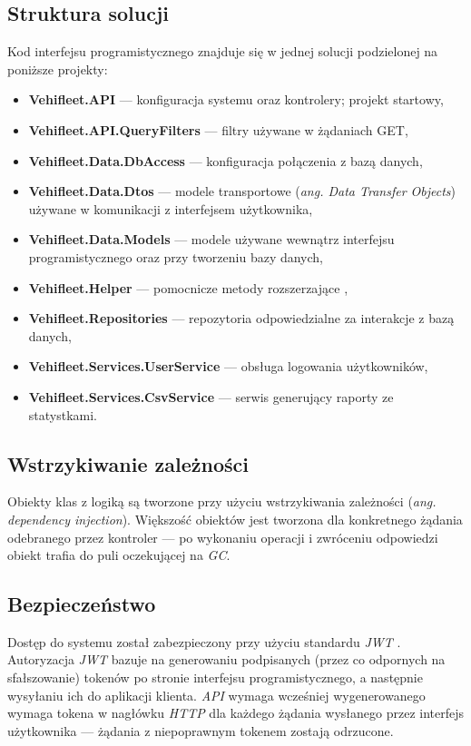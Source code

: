 \documentclass[eng,printmode,openany]{mgr}
\begin{document}
	\subsection{Struktura solucji}
	Kod interfejsu programistycznego znajduje się w jednej solucji podzielonej na  poniższe projekty:
	\begin{itemize}
		\item \textbf{Vehifleet.API} — konfiguracja systemu oraz kontrolery; projekt startowy,
		\item \textbf{Vehifleet.API.QueryFilters} — filtry używane w żądaniach GET,
		\item \textbf{Vehifleet.Data.DbAccess} — konfiguracja połączenia z bazą danych,
		\item \textbf{Vehifleet.Data.Dtos} — modele transportowe (\textit{ang. Data Transfer Objects}) używane w komunikacji z interfejsem użytkownika,
		\item \textbf{Vehifleet.Data.Models} — modele używane wewnątrz interfejsu programistycznego oraz przy tworzeniu bazy danych,
		\item \textbf{Vehifleet.Helper} — pomocnicze metody rozszerzające \cite{msdn-extension},
		\item \textbf{Vehifleet.Repositories} — repozytoria odpowiedzialne za interakcje z bazą danych,
		\item \textbf{Vehifleet.Services.UserService} — obsługa logowania użytkowników,
		\item \textbf{Vehifleet.Services.CsvService} — serwis generujący raporty ze statystkami.
	\end{itemize}
	
	\subsection{Wstrzykiwanie zależności}
	Obiekty klas z logiką są tworzone przy użyciu wstrzykiwania zależności (\textit{ang. dependency injection}). Większość obiektów jest tworzona dla konkretnego żądania odebranego przez kontroler — po wykonaniu operacji i zwróceniu odpowiedzi obiekt trafia do puli oczekującej na \textit{GC}.
	
	\newpage
	\subsection{Bezpieczeństwo}
	Dostęp do systemu został zabezpieczony przy użyciu standardu \textit{JWT} \cite{jwt}. Autoryzacja \textit{JWT} bazuje na generowaniu podpisanych (przez co odpornych na sfałszowanie) tokenów po stronie interfejsu programistycznego, a następnie wysyłaniu ich do aplikacji klienta. \textit{API} wymaga wcześniej wygenerowanego wymaga tokena w nagłówku \textit{HTTP} dla każdego żądania wysłanego przez interfejs użytkownika — żądania z niepoprawnym tokenem zostają odrzucone.
	
\end{document}
